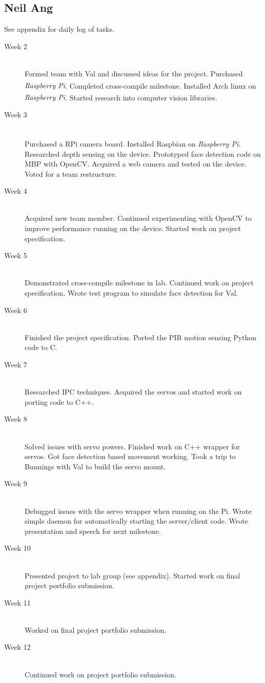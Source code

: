 \documentclass[11pt,a4paper,titlepage]{report}
\newcommand{\rpi}{\textit{Raspberry Pi\textsuperscript{\textregistered}}}
\begin{document}
\subsection{Neil Ang}
See appendix for daily log of tasks.
\begin{description}

  \item[Week 2] \hfill \\
      Formed team with Val and discussed ideas for the project. Purchased \rpi. Completed cross-compile milestone. Installed Arch linux on \rpi. Started research into computer vision libraries.
  \item[Week 3] \hfill \\
      Purchased a RPi camera board. Installed Raspbian on \rpi. Researched depth sensing on the device. Prototyped face detection code on MBP with OpenCV. Acquired a web camera and tested on the device. Voted for a team restructure.
  \item[Week 4] \hfill \\
      Acquired new team member. Continued experimenting with OpenCV to improve performance running on the device. Started work on project specification.
  \item[Week 5] \hfill \\
      Demonstrated cross-compile milestone in lab. Continued work on project specification. Wrote test program to simulate face detection for Val.
  \item[Week 6] \hfill \\
      Finished the project specification. Ported the PIR motion sensing Python code to C.
  \item[Week 7] \hfill \\
      Researched IPC techniques. Acquired the servos and started work on porting code to C++.
  \item[Week 8] \hfill \\
      Solved issues with servo powers. Finished work on C++ wrapper for servos. Got face detection based movement working. Took a trip to Bunnings with Val to build the servo mount.
  \item[Week 9] \hfill \\
      Debugged issues with the servo wrapper when running on the Pi. Wrote simple daemon for automatically starting the server/client code. Wrote presentation and speech for next milestone.
  \item[Week 10] \hfill \\
      Presented project to lab group (see appendix). Started work on final project portfolio submission.
  \item[Week 11] \hfill \\
      Worked on final project portfolio submission.
  \item[Week 12] \hfill \\
      Continued work on project portfolio submission.

\end{description}
\end{document}
